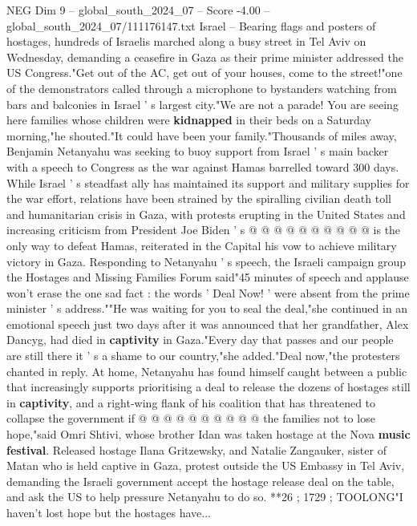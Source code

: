 \begin{textsample}{NEG Dim 9 – global\_south\_2024\_07 – Score -4.00 – global\_south\_2024\_07/111176147.txt}  \label{ex:f9_neg_336}
Israel -- Bearing flags and posters of hostages, hundreds of Israelis marched along a busy street in Tel Aviv on Wednesday, demanding a ceasefire in Gaza as their prime minister addressed the US Congress."Get out of the AC, get out of your houses, come to the street!"one of the demonstrators called through a microphone to bystanders watching from bars and balconies in Israel ' s largest city."We are not a parade!
You are seeing here families whose children were \textbf{kidnapped} in their beds on a Saturday morning,"he shouted."It could have been your family."Thousands of miles away, Benjamin Netanyahu was seeking to buoy support from Israel ' s main backer with a speech to Congress as the war against Hamas barrelled toward 300 days.
While Israel ' s steadfast ally has maintained its support and military supplies for the war effort, relations have been strained by the spiralling civilian death toll and humanitarian crisis in Gaza, with protests erupting in the United States and increasing criticism from President Joe Biden ' s @ @ @ @ @ @ @ @ @ @ is the only way to defeat Hamas, reiterated in the Capital his vow to achieve military victory in Gaza.
Responding to Netanyahu ' s speech, the Israeli campaign group the Hostages and Missing Families Forum said"45 minutes of speech and applause won't erase the one sad fact : the words ' Deal Now! ' were absent from the prime minister ' s address.""He was waiting for you to seal the deal,"she continued in an emotional speech just two days after it was announced that her grandfather, Alex Dancyg, had died in \textbf{captivity} in Gaza."Every day that passes and our people are still there it ' s a shame to our country,"she added."Deal now,"the protesters chanted in reply.
At home, Netanyahu has found himself caught between a public that increasingly supports prioritising a deal to release the dozens of hostages still in \textbf{captivity}, and a right-wing flank of his coalition that has threatened to collapse the government if @ @ @ @ @ @ @ @ @ @ the families not to lose hope,"said Omri Shtivi, whose brother Idan was taken hostage at the Nova \textbf{music} \textbf{festival}.
Released hostage Ilana Gritzewsky, and Natalie Zangauker, sister of Matan who is held captive in Gaza, protest outside the US Embassy in Tel Aviv, demanding the Israeli government accept the hostage release deal on the table, and ask the US to help pressure Netanyahu to do so. **26 ; 1729 ; TOOLONG"I haven't lost hope but the hostages have...

\end{textsample}
